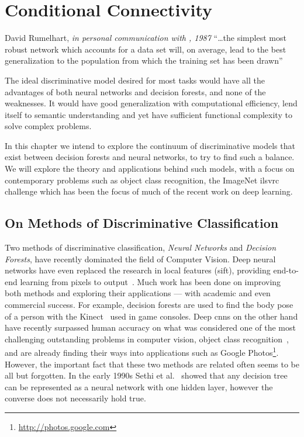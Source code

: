 \documentclass[thesis]{subfiles}
\begin{document}
	\chapter{Conditional Connectivity}\label{conditionalnetworks}
	\begin{chapquote}{David Rumelhart, \textit{in personal communication with \citet{hanson1989comparing}, 1987}}
		``\ldots the simplest most robust network which accounts for a data set will, on average, lead to the best generalization to the population from which the training set has been drawn''
	\end{chapquote}
	
	The ideal discriminative model desired for most tasks would have all the advantages of both neural networks and decision forests, and none of the weaknesses. It would have good generalization with computational efficiency, lend itself to semantic understanding and yet have sufficient functional complexity to solve complex problems. 
	
	In this chapter we intend to explore the continuum of discriminative models that exist between decision forests and neural networks, to try to find such a balance. We will explore the theory and applications behind such models, with a focus on contemporary problems such as object class recognition, \ie the ImageNet \gls{ilsvrc} challenge which has been the focus of much of the recent work on deep learning.
	
	\section{On Methods of Discriminative Classification}
	Two methods of discriminative classification, \emph{Neural Networks} and \emph{Decision Forests}, have recently dominated the field of Computer Vision. Deep neural networks have even replaced the research in local features (\eg \gls{sift}), providing end-to-end learning from pixels to output~\citep{yi2016lift}. Much work has been done on improving both methods and exploring their applications --- with academic and even commercial success. For example, decision forests are used to find the body pose of a person with the Kinect~\citep{conf/cvpr/ShottonFCSFMKB11} used in game consoles. Deep \glspl{cnn} on the other hand have recently surpassed human accuracy on what was considered one of the most challenging outstanding problems in computer vision, object class recognition~\citep{He2015b}, and are already finding their ways into applications such as Google Photos\footnote{\href{http://photos.google.com}{http://photos.google.com}}. However, the important fact that these two methods are related often seems to be all but forgotten. In the early 1990s Sethi et al.~\citep{Sethi1990} showed that any decision tree can be represented as a neural network with one hidden layer, however the converse does not necessarily hold true.
	
\end{document}
